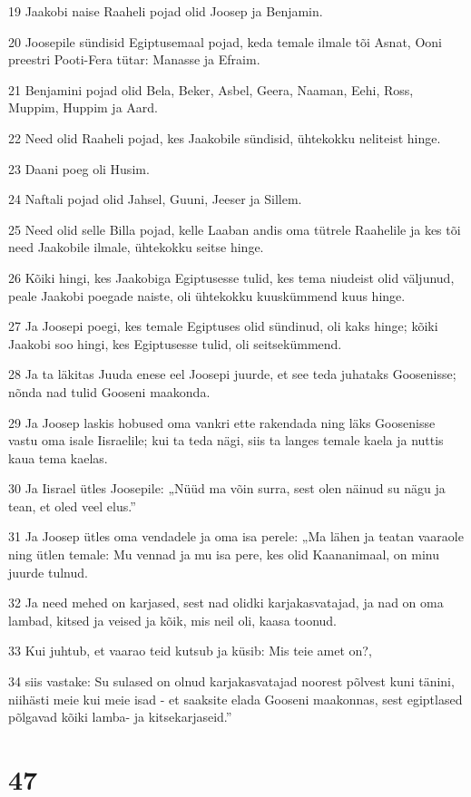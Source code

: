 \par 19 Jaakobi naise Raaheli pojad olid Joosep ja Benjamin.
\par 20 Joosepile sündisid Egiptusemaal pojad, keda temale ilmale tõi Asnat, Ooni preestri Pooti-Fera tütar: Manasse ja Efraim.
\par 21 Benjamini pojad olid Bela, Beker, Asbel, Geera, Naaman, Eehi, Ross, Muppim, Huppim ja Aard.
\par 22 Need olid Raaheli pojad, kes Jaakobile sündisid, ühtekokku neliteist hinge.
\par 23 Daani poeg oli Husim.
\par 24 Naftali pojad olid Jahsel, Guuni, Jeeser ja Sillem.
\par 25 Need olid selle Billa pojad, kelle Laaban andis oma tütrele Raahelile ja kes tõi need Jaakobile ilmale, ühtekokku seitse hinge.
\par 26 Kõiki hingi, kes Jaakobiga Egiptusesse tulid, kes tema niudeist olid väljunud, peale Jaakobi poegade naiste, oli ühtekokku kuuskümmend kuus hinge.
\par 27 Ja Joosepi poegi, kes temale Egiptuses olid sündinud, oli kaks hinge; kõiki Jaakobi soo hingi, kes Egiptusesse tulid, oli seitsekümmend.
\par 28 Ja ta läkitas Juuda enese eel Joosepi juurde, et see teda juhataks Goosenisse; nõnda nad tulid Gooseni maakonda.
\par 29 Ja Joosep laskis hobused oma vankri ette rakendada ning läks Goosenisse vastu oma isale Iisraelile; kui ta teda nägi, siis ta langes temale kaela ja nuttis kaua tema kaelas.
\par 30 Ja Iisrael ütles Joosepile: „Nüüd ma võin surra, sest olen näinud su nägu ja tean, et oled veel elus.”
\par 31 Ja Joosep ütles oma vendadele ja oma isa perele: „Ma lähen ja teatan vaaraole ning ütlen temale: Mu vennad ja mu isa pere, kes olid Kaananimaal, on minu juurde tulnud.
\par 32 Ja need mehed on karjased, sest nad olidki karjakasvatajad, ja nad on oma lambad, kitsed ja veised ja kõik, mis neil oli, kaasa toonud.
\par 33 Kui juhtub, et vaarao teid kutsub ja küsib: Mis teie amet on?,
\par 34 siis vastake: Su sulased on olnud karjakasvatajad noorest põlvest kuni tänini, niihästi meie kui meie isad - et saaksite elada Gooseni maakonnas, sest egiptlased põlgavad kõiki lamba- ja kitsekarjaseid.”

\chapter{47}

